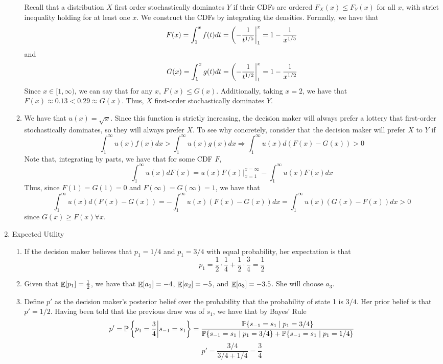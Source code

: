 \documentclass[12pt]{article}
\begin{document}
\begin{enumerate}
\begin{enumerate}
		Recall that a distribution $X$ first order stochastically dominates $Y$ if their CDFs are ordered $F_X(x) \le F_Y(x)$ for all $x$, with strict inequality holding for at least one $x$. We construct the CDFs by integrating the densities. Formally, we have that
		\[
		F(x) = \int_1^x f(t)dt = \left( -\frac{1}{t^{1/5}}\right|_1^x = 1 - \frac{1}{x^{1/5}}
		\]
		and
		\[
		G(x) =  \int_1^x g(t)dt = \left( -\frac{1}{t^{1/2}}\right|_1^x = 1 - \frac{1}{x^{1/2}}
		\]
		Since $x \in [1,\infty)$, we can say that for any $x$, $F(x) \le G(x)$. Additionally, taking $x = 2$, we have that $F(x) \approx 0.13 < 0.29 \approx G(x)$. Thus, $X$ first-order stochastically dominates $Y$.
		\item We have that $u(x) = \sqrt{x}$. Since this function is strictly increasing, the decision maker will always prefer a lottery that first-order stochastically dominates, so they will always prefer $X$. To see why concretely, consider that the decision maker will prefer $X$ to $Y$ if
		\[
		\int_{1}^\infty u(x)f(x) dx > \int_1^\infty u(x)g(x) dx \Longrightarrow \int_1^\infty u(x)d(F(x)-G(x)) > 0
		\]
		Note that, integrating by parts, we have that for some CDF $F$,
		\[
		\int_1^\infty u(x) dF(x) = u(x)F(x)|_{x=1}^{x=\infty} - \int_1^\infty u(x)F(x)dx
		\]
		Thus, since $F(1)=G(1) = 0$ and $F(\infty) = G(\infty) = 1$, we have that
		\[
		\int_1^\infty u(x)d(F(x)-G(x)) = - \int_{1}^\infty u(x)(F(x)-G(x))dx = \int_{1}^\infty u(x)(G(x)-F(x))dx > 0
		\]
		since $G(x) \ge F(x) \forall x$.
		\end{enumerate}
	\item Expected Utility
	\begin{enumerate}
		\item If the decision maker believes that $p_1 = 1/4$ and $p_1 = 3/4$ with equal probability, her expectation is that
		\[
		p_1 = \frac{1}{2} \cdot \frac{1}{4} + \frac{1}{2} \cdot \frac{3}{4} = \frac{1}{2}
		\]
		\item Given that $\mathop{\mathbb{E}}[p_1] = \frac{1}{2}$, we have that $\mathop{\mathbb{E}}[a_1] = -4$, $\mathop{\mathbb{E}}[a_2] = -5$, and $\mathop{\mathbb{E}}[a_3] = -3.5$. She will choose $a_3$.
		\item Define $p'$ as the decision maker's posterior belief over the probability that the probability of state 1 is $3/4$. Her prior belief is that $p' = 1/2$. Having been told that the previous draw was of $s_1$, we have that by Bayes' Rule
		\[
		p' = \mathbb{P}\left\{ p_1 = \frac{3}{4} \middle| s_{-1} = s_1\right\} = \frac{\mathbb{P}\{s_{-1} = s_1 \mid p_1 = 3/4\}}{\mathbb{P}\{s_{-1} = s_1 \mid p_1 = 3/4\} + \mathbb{P}\{s_{-1} = s_1 \mid p_1 = 1/4\}}\]\[p' = \frac{3/4}{3/4 + 1/4} = \frac{3}{4}
\]
\end{enumerate}
\end{enumerate}
\end{document}
